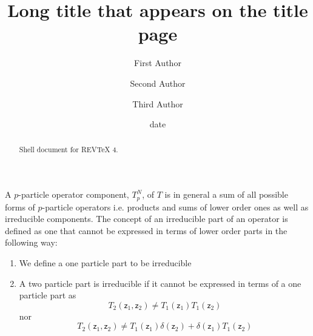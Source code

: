 \documentclass[aps,preprint]{revtex4}%
\begin{document}
\title[Short title for running header]{Long title that appears on the title page}
\author{First Author}
\author{Second Author}
\author{Third Author}

\begin{abstract}
Shell document for REV\TeX{} 4.

\end{abstract}
\date[Date text]{date}




\maketitle
\tableofcontents


A $p$-particle operator component, $T_{p}^{N}$, of $T$ is in general a sum of
all possible forms of $p$-particle operators i.e. products and sums of lower
order ones as well as irreducible components. The concept of an irreducible
part of an operator is defined as one that cannot be expressed in terms of
lower order parts in the following way:

\begin{enumerate}
\item[1] We define a one particle part to be irreducible

\item[2] A two particle part is irreducible if it cannot be expressed in terms
of a one particle part as
\begin{equation}
T_{2}\left(  \mathsf{z}_{1},\mathsf{z}_{2}\right)  \neq T_{1}\left(
\mathsf{z}_{1}\right)  T_{1}\left(  \mathsf{z}_{2}\right)
\end{equation}
nor
\begin{equation}
T_{2}\left(  \mathsf{z}_{1},\mathsf{z}_{2}\right)  \neq T_{1}\left(
\mathsf{z}_{1}\right)  \delta\left(  \mathsf{z}_{2}\right)  +\delta\left(
\mathsf{z}_{1}\right)  T_{1}\left(  \mathsf{z}_{2}\right)
\end{equation}

\end{enumerate}
\end{document}
